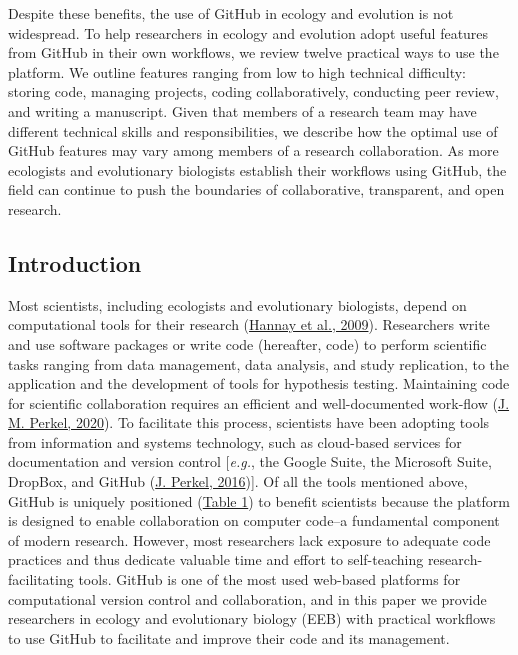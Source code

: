 Despite these benefits, the use of GitHub in ecology and evolution is not widespread.
To help researchers in ecology and evolution adopt useful features from GitHub in their own workflows, we review twelve practical ways to use the platform.
We outline features ranging from low to high technical difficulty: storing code, managing projects, coding collaboratively, conducting peer review, and writing a manuscript.
Given that members of a research team may have different technical skills and responsibilities, we describe how the optimal use of GitHub features may vary among members of a research collaboration.
As more ecologists and evolutionary biologists establish their workflows using GitHub, the field can continue to push the boundaries of collaborative, transparent, and open research.

\hypertarget{introduction}{%
\subsection{Introduction}\label{introduction}}

Most scientists, including ecologists and evolutionary biologists, depend on computational tools for their research (\protect\hyperlink{ref-fJWFe93e}{Hannay et al., 2009}).
Researchers write and use software packages or write code (hereafter, code) to perform scientific tasks ranging from data management, data analysis, and study replication, to the application and the development of tools for hypothesis testing.
Maintaining code for scientific collaboration requires an efficient and well-documented work-flow (\protect\hyperlink{ref-1Kqna6l2}{J. M. Perkel, 2020}).
To facilitate this process, scientists have been adopting tools from information and systems technology, such as cloud-based services for documentation and version control {[}\emph{e.g.}, the Google Suite, the Microsoft Suite, DropBox, and GitHub (\protect\hyperlink{ref-10ghgV3S8}{J. Perkel, 2016}){]}.
Of all the tools mentioned above, GitHub is uniquely positioned (\protect\hyperlink{tbl:compare}{Table 1}) to benefit scientists because the platform is designed to enable collaboration on computer code--a fundamental component of modern research.
However, most researchers lack exposure to adequate code practices and thus dedicate valuable time and effort to self-teaching research-facilitating tools.
GitHub is one of the most used web-based platforms for computational version control and collaboration, and in this paper we provide researchers in ecology and evolutionary biology (EEB) with practical workflows to use GitHub to facilitate and improve their code and its management.

